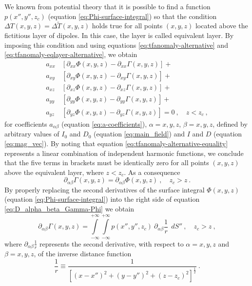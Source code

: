 We known from potential theory that it is possible to find a function $p(x'', y'', z_{c})$
(equation \ref{eq:Phi-surface-integral}) so that the condition
$\Delta T(x, y, z) = \Delta \tilde{T}(x, y, z)$ holds true for all points $(x, y, z)$
located above the fictitious layer of dipoles. 
In this case, the layer is called equivalent layer. 
By imposing this condition and using equations \ref{eq:tfanomaly-alternative} and
\ref{eq:tfanomaly-eqlayer-alternative}, we obtain
\begin{equation}
\begin{split}
a_{xx} \, &\left[\partial_{xx} \Phi(x, y, z) - \partial_{xx} \Gamma(x, y, z) \right] + \\
a_{xy} \, &\left[\partial_{xy} \Phi(x, y, z) - \partial_{xy} \Gamma(x, y, z) \right] + \\
a_{xz} \, &\left[\partial_{xz} \Phi(x, y, z) - \partial_{xz} \Gamma(x, y, z) \right] + \\
a_{yy} \, &\left[\partial_{yy} \Phi(x, y, z) - \partial_{yy} \Gamma(x, y, z) \right] + \\
a_{yz} \, &\left[\partial_{yz} \Phi(x, y, z) - \partial_{yz} \Gamma(x, y, z) \right] = 0
\: , \quad z < z_{c} \: ,
\end{split}
\label{eq:tfanomaly-alternative-equality}
\end{equation}
for coefficients $a_{\alpha\beta}$ (equation \ref{eq:a-coefficients}), 
$\alpha = x, y, z$, $\beta = x, y, z$, defined by arbitrary values of 
$I_{0}$ and $D_{0}$ (equation \ref{eq:main_field}) and 
$I$ and $D$ (equation \ref{eq:mag_vec}).
By noting that equation \ref{eq:tfanomaly-alternative-equality} represents a linear 
combination of independent harmonic functions, we conclude that the five terms
in brackets must be identically zero for all points $(x, y, z)$ above the equivalent 
layer, where $z < z_{c}$. As a consequence
\begin{equation}
	\partial_{\alpha\beta} \Gamma(x, y, z) = \partial_{\alpha\beta} \Phi(x, y, z)
	\: , \quad z_{c} > z \: .
	\label{eq:D_alpha_beta_Gamma-Phi}
\end{equation}
By properly replacing the second derivatives of the surface integral 
$\Phi(x, y, z)$ (equation \ref{eq:Phi-surface-integral}) into the right 
side of equation \ref{eq:D_alpha_beta_Gamma-Phi} we obtain
\begin{equation}
	\partial_{\alpha\beta} \Gamma(x, y, z) = 
	\int\limits_{-\infty}^{+\infty}\int\limits_{-\infty}^{+\infty}
	p(x'', y'', z_{c}) \: \partial_{\alpha\beta} \frac{1}{r} \:\: dS'' \: ,
	\quad z_{c} > z \: ,
	\label{eq:D_alpha_beta_Gamma}
\end{equation}
where $\partial_{\alpha\beta} \frac{1}{r}$ represents the second derivative,
with respect to $\alpha = x, y, z$ and $\beta = x, y, z$, of the inverse distance 
function
\begin{equation}
	\frac{1}{r} \equiv 
	\frac{1}{\left[ (x-x'')^2 + (y-y'')^2 + (z-z_{c})^2 \right]^{\frac{1}{2}}} \: .
	\label{eq:inverse-distance}
\end{equation}


